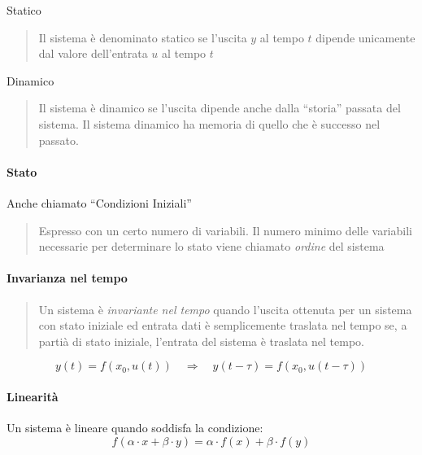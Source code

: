 \documentclass[11pt]{article}
\begin{document}
Statico

\begin{quote}
Il sistema è denominato statico se l'uscita \(y\) al tempo \(t\) dipende
unicamente dal valore dell'entrata \(u\) al tempo \(t\)
\end{quote}

Dinamico

\begin{quote}
Il sistema è dinamico se l'uscita dipende anche dalla ``storia'' passata
del sistema. Il sistema dinamico ha memoria di quello che è successo nel
passato.
\end{quote}

\hypertarget{stato}{%
\paragraph{Stato}\label{stato}}

Anche chiamato ``Condizioni Iniziali''

\begin{quote}
Espresso con un certo numero di variabili. Il numero minimo delle
variabili necessarie per determinare lo stato viene chiamato
\emph{ordine} del sistema
\end{quote}

\hypertarget{invarianza-nel-tempo}{%
\paragraph{Invarianza nel tempo}\label{invarianza-nel-tempo}}

\begin{quote}
Un sistema è \emph{invariante nel tempo} quando l'uscita ottenuta per un
sistema con stato iniziale ed entrata dati è semplicemente traslata nel
tempo se, a partià di stato iniziale, l'entrata del sistema è traslata
nel tempo.
\end{quote}

\begin{equation}
y(t) = f(x_0, u(t))\quad \Longrightarrow \quad y(t-\tau) = f(x_0, u(t-\tau))
\end{equation}

\hypertarget{linearituxe0}{%
\paragraph{Linearità}\label{linearituxe0}}

Un sistema è lineare quando soddisfa la condizione: \begin{equation}
f(\alpha \cdot x + \beta \cdot y) = \alpha \cdot f(x) + \beta \cdot f(y)
\end{equation}
\end{document}
